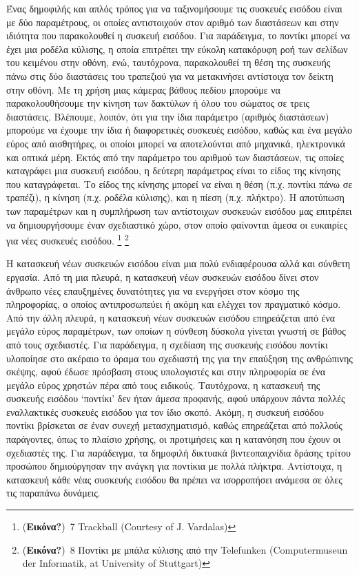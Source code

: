\documentclass[
]{article}
\begin{document}
Ένας δημοφιλής και απλός τρόπος για να ταξινομήσουμε τις συσκευές
εισόδου είναι με δύο παραμέτρους, οι οποίες αντιστοιχούν στον αριθμό των
διαστάσεων και στην ιδιότητα που παρακολουθεί η συσκευή εισόδου. Για
παράδειγμα, το ποντίκι μπορεί να έχει μια ροδέλα κύλισης, η οποία
επιτρέπει την εύκολη κατακόρυφη ροή των σελίδων του κειμένου στην οθόνη,
ενώ, ταυτόχρονα, παρακολουθεί τη θέση της συσκευής πάνω στις δύο
διαστάσεις του τραπεζιού για να μετακινήσει αντίστοιχα τον δείκτη στην
οθόνη. Με τη χρήση μιας κάμερας βάθους πεδίου μπορούμε να
παρακολουθήσουμε την κίνηση των δακτύλων ή όλου του σώματος σε τρεις
διαστάσεις. Βλέπουμε, λοιπόν, ότι για την ίδια παράμετρο (αριθμός
διαστάσεων) μπορούμε να έχουμε την ίδια ή διαφορετικές συσκευές εισόδου,
καθώς και ένα μεγάλο εύρος από αισθητήρες, οι οποίοι μπορεί να
αποτελούνται από μηχανικά, ηλεκτρονικά και οπτικά μέρη. Εκτός από την
παράμετρο του αριθμού των διαστάσεων, τις οποίες καταγράφει μια συσκευή
εισόδου, η δεύτερη παράμετρος είναι το είδος της κίνησης που
καταγράφεται. Το είδος της κίνησης μπορεί να είναι η θέση (π.χ. ποντίκι
πάνω σε τραπέζι), η κίνηση (π.χ. ροδέλα κύλισης), και η πίεση (π.χ.
πλήκτρο). Η αποτύπωση των παραμέτρων και η συμπλήρωση των αντίστοιχων
συσκευών εισόδου μας επιτρέπει να δημιουργήσουμε έναν σχεδιαστικό χώρο,
στον οποίο φαίνονται άμεσα οι ευκαιρίες για νέες συσκευές εισόδου.
\footnote{(\textbf{Εικόνα?})~7 Trackball (Courtesy of J. Vardalas)}
\footnote{(\textbf{Εικόνα?})~8 Ποντίκι με μπάλα κύλισης από την
  Telefunken (Computermuseun der Informatik, at University of Stuttgart)}

Η κατασκευή νέων συσκευών εισόδου είναι μια πολύ ενδιαφέρουσα αλλά και
σύνθετη εργασία. Από τη μια πλευρά, η κατασκευή νέων συσκευών εισόδου
δίνει στον άνθρωπο νέες επαυξημένες δυνατότητες για να ενεργήσει στον
κόσμο της πληροφορίας, ο οποίος αντιπροσωπεύει ή ακόμη και ελέγχει τον
πραγματικό κόσμο. Από την άλλη πλευρά, η κατασκευή νέων συσκευών εισόδου
επηρεάζεται από ένα μεγάλο εύρος παραμέτρων, των οποίων η σύνθεση
δύσκολα γίνεται γνωστή σε βάθος από τους σχεδιαστές. Για παράδειγμα, η
σχεδίαση της συσκευής εισόδου ποντίκι υλοποίησε στο ακέραιο το όραμα του
σχεδιαστή της για την επαύξηση της ανθρώπινης σκέψης, αφού έδωσε
πρόσβαση στους υπολογιστές και στην πληροφορία σε ένα μεγάλο εύρος
χρηστών πέρα από τους ειδικούς. Ταυτόχρονα, η κατασκευή της συσκευής
εισόδου `ποντίκι' δεν ήταν άμεσα προφανής, αφού υπάρχουν πάντα πολλές
εναλλακτικές συσκευές εισόδου για τον ίδιο σκοπό. Ακόμη, η συσκευή
εισόδου ποντίκι βρίσκεται σε έναν συνεχή μετασχηματισμό, καθώς
επηρεάζεται από πολλούς παράγοντες, όπως το πλαίσιο χρήσης, οι
προτιμήσεις και η κατανόηση που έχουν οι σχεδιαστές της. Για παράδειγμα,
τα δημοφιλή δικτυακά βιντεοπαιχνίδια δράσης τρίτου προσώπου δημιούργησαν
την ανάγκη για ποντίκια με πολλά πλήκτρα. Αντίστοιχα, η κατασκευή κάθε
νέας συσκευής εισόδου θα πρέπει να ισορροπήσει ανάμεσα σε όλες τις
παραπάνω δυνάμεις.
\end{document}
